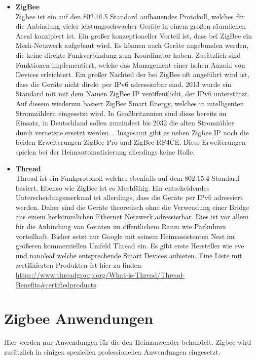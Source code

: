 \begin{itemize}
    \item \textbf{ZigBee}\\
    Zigbee \cite{zigbee} ist ein auf den 802.40.5 Standard aufbauendes Protokoll, welches für die Anbindung vieler leistungsschwacher
    Geräte in einem großen räumlichen Areal konzipiert ist. Ein großer konzeptioneller Vorteil ist, dass bei 
    ZigBee ein Mesh-Netzwerk aufgebaut wird. Es können auch Geräte angebunden werden, die keine direkte Funkverbindung
    zum Koordinator haben. Zusätzlich sind Funktionen implementiert, welche das Management einer hohen Anzahl von Devices
    erleichtert. Ein großer Nachteil der bei ZigBee oft angeführt wird ist, dass die Geräte nicht direkt per IPv6 adressierbar sind. 2013 wurde 
    ein Standard mit mit dem Namen \grqq ZigBee IP\grqq{} veröffentlicht, der IPv6 unterstützt. Auf diesem wiederum basiert ZigBee Smart Energy, welches in 
    intelligenten Stromzählern eingesetzt wird. In Großbritannien sind diese bereits im Einsatz\cite{se}, in Deutschland sollen zumindest bis 2032 die alten Stromzähler 
    durch vernetzte ersetzt werden. \cite{bmwk}. Insgesamt gibt es neben Zigbee IP noch die beiden Erweiterungen ZigBee Pro und ZigBee RF4CE. Diese Erweiterungen spielen
    bei der Heimautomatisierung allerdings keine Rolle.
    
    \item \textbf{Thread}\\
    Thread \cite{thread} ist ein Funkprotokoll welches ebenfalls auf dem 802.15.4 Standard basiert. Ebenso wie ZigBee ist es Meshfähig. Ein
    entscheidendes Unterscheidungsmerkmal ist allerdings, dass die Geräte per IPv6 adressiert werden. Daher sind die Geräte
    theoretisch ohne die Verwendung einer Bridge aus einem herkömmlichen Ethernet Netzwerk adressierbar. Dies ist vor allem für die Anbindung 
    von Geräten im öffentlichem Raum wie Parkuhren vorteilhaft. Bisher setzt nur Google mit seinem Heimassistenten Nest im größeren kommerziellen
    Umfeld Thread ein. Es gibt erste Hersteller wie eve und nanoleaf welche entsprechende Smart Devices anbieten. Eine Liste mit zertifizierten Produkten ist 
    hier zu finden: \url{https://www.threadgroup.org/What-is-Thread/Thread-Benefits#certifiedproducts}
\end{itemize}

\section{Zigbee Anwendungen}

Hier werden nur Anwendungen für die den Heimanwender behandelt. Zigbee wird zusätzlich in einigen speziellen professionellen Anwendungen eingesetzt.

